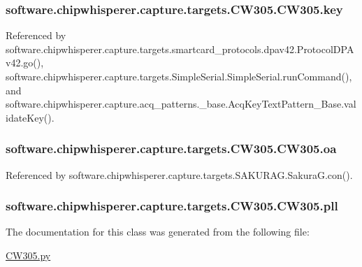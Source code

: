 \subsubsection[{key}]{\setlength{\rightskip}{0pt plus 5cm}software.\+chipwhisperer.\+capture.\+targets.\+C\+W305.\+C\+W305.\+key}\label{classsoftware_1_1chipwhisperer_1_1capture_1_1targets_1_1CW305_1_1CW305_a4edb04d12ef348e1d077f944c3d3f9ae}


Referenced by software.\+chipwhisperer.\+capture.\+targets.\+smartcard\+\_\+protocols.\+dpav42.\+Protocol\+D\+P\+Av42.\+go(), software.\+chipwhisperer.\+capture.\+targets.\+Simple\+Serial.\+Simple\+Serial.\+run\+Command(), and software.\+chipwhisperer.\+capture.\+acq\+\_\+patterns.\+\_\+base.\+Acq\+Key\+Text\+Pattern\+\_\+\+Base.\+validate\+Key().

\hypertarget{classsoftware_1_1chipwhisperer_1_1capture_1_1targets_1_1CW305_1_1CW305_a0fa602c9e03b1a8d5fef94f14b98d146}{}
\subsubsection[{oa}]{\setlength{\rightskip}{0pt plus 5cm}software.\+chipwhisperer.\+capture.\+targets.\+C\+W305.\+C\+W305.\+oa}\label{classsoftware_1_1chipwhisperer_1_1capture_1_1targets_1_1CW305_1_1CW305_a0fa602c9e03b1a8d5fef94f14b98d146}


Referenced by software.\+chipwhisperer.\+capture.\+targets.\+S\+A\+K\+U\+R\+A\+G.\+Sakura\+G.\+con().

\hypertarget{classsoftware_1_1chipwhisperer_1_1capture_1_1targets_1_1CW305_1_1CW305_a24cd268472d2e99412f1079dbd72fee9}{}
\subsubsection[{pll}]{\setlength{\rightskip}{0pt plus 5cm}software.\+chipwhisperer.\+capture.\+targets.\+C\+W305.\+C\+W305.\+pll}\label{classsoftware_1_1chipwhisperer_1_1capture_1_1targets_1_1CW305_1_1CW305_a24cd268472d2e99412f1079dbd72fee9}


The documentation for this class was generated from the following file\+:\begin{DoxyCompactItemize}
\item 
\hyperlink{CW305_8py}{C\+W305.\+py}\end{DoxyCompactItemize}
